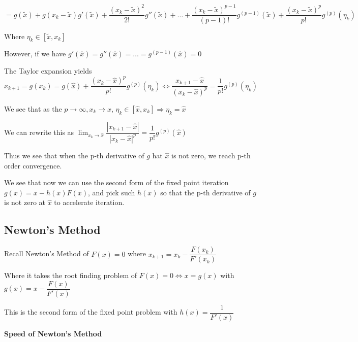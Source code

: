 \documentclass{article}
\begin{document}
$ = g(\tilde{x}) + g(x_k - \tilde{x})g'(\tilde{x}) + \dfrac{(x_k - \tilde{x})^2}{2!}g''(\tilde{x}) + \dots + \dfrac{(x_k - \tilde{x})^{p - 1}}{(p - 1)!} g^{(p - 1)} (\tilde{x}) + \dfrac{(x_k - \tilde{x})^p}{p!}g^{(p)}(\eta_k)$

Where $\eta_k \in [\tilde{x}, x_k]$

\vspace{0.2cm}

However, if we have $g'(\hat{x}) = g''(\hat{x}) = \dots = g^{(p - 1)} (\hat{x}) = 0$

The Taylor expansion yields $x_{k + 1} = g(x_k) = g(\hat{x}) + \dfrac{(x_k - \hat{x})^p}{p!}g^{(p)} (\eta_k) \Leftrightarrow \dfrac{x_{k + 1} - \hat{x}}{(x_k - \hat{x})^p} = \dfrac{1}{p!}g^{(p)} (\eta_k)$

\vspace{0.2cm}

We see that as the $p \to \infty, x_k \to \hat{x}$, $\eta_k \in [\hat{x}, x_k] \Rightarrow \eta_k = \hat{x}$

We can rewrite this as $\displaystyle \lim_{x_k \to \hat{x}} \dfrac{| x_{k + 1} - \hat{x} |}{ |x_k - \hat{x} |^p} = \dfrac{1}{p!} g^{(p)}(\hat{x})$

Thus we see that when the p-th derivative of $g$ hat $\hat{x}$ is not zero, we reach p-th order convergence.

\vspace{0.3cm}

We see that now we can use the second form of the fixed point iteration $g(x) = x - h(x) F(x)$, and pick such $h(x)$ so that the p-th derivative of $g$ is not zero at $\hat{x}$ to accelerate iteration.
 
\subsection{Newton's Method}

Recall Newton's Method of $F(x) = 0$ where $x_{k + 1} = x_k - \dfrac{F(x_k)}{F'(x_k)}$

Where it takes the root finding problem of $F(x) = 0 \Leftrightarrow x = g(x)$ with $g(x) = x - \dfrac{F(x)}{F'(x)}$

This is the second form of the fixed point problem with $h(x) = \dfrac{1}{F'(x)}$

\vspace{0.2cm}

\textbf{Speed of Newton's Method}

\vspace{0.2cm}
\end{document}
